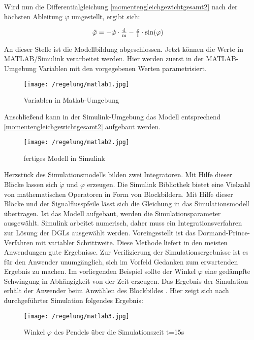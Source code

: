 Wird nun die Differentialgleichung \ref{momentengleichgewichtgesamt2} nach der höchsten Ableitung $\ddot\varphi$ umgestellt, ergibt sich:

\begin{align}
	\ddot\varphi = -\dot\varphi \cdot \tfrac{\i{d}}{\i{m}} - \tfrac{\i{g}}{\i{l}} \cdot \si{sin}(\varphi)
	\label{diffgleichung} 
\end{align}

An dieser Stelle ist die Modellbildung abgeschlossen. Jetzt können die Werte in MATLAB/Simulink  verarbeitet werden.
Hier werden zuerst in der MATLAB-Umgebung Variablen mit den vorgegebenen Werten parametrisiert.

\begin{figure}[h]
	\centering
	\texttt{[image: /regelung/matlab1.jpg]}
	\label{fig:matlab1}
	\caption{Variablen in Matlab-Umgebung}
\end{figure}

Anschließend kann in der Simulink-Umgebung das Modell entsprechend \ref{momentengleichgewichtgesamt2} aufgebaut werden.

\begin{figure}[h]
	\centering
	\texttt{[image: /regelung/matlab2.jpg]}
	\label{fig:matlab2}
	\caption{fertiges Modell in Simulink}
\end{figure}

Herzstück des Simulationsmodells bilden zwei Integratoren.
Mit Hilfe dieser Blöcke lassen sich  $\dot{\varphi}$ und $\varphi$ erzeugen.
Die Simulink Bibliothek bietet eine Vielzahl von mathematischen Operatoren in Form von Blockbildern.
Mit Hilfe dieser Blöcke und der Signalflusspfeile lässt sich die Gleichung in das Simulationsmodell übertragen.
Ist das Modell aufgebaut, werden die Simulationsparameter ausgewählt. 
Simulink arbeitet numerisch, daher muss ein Integrationsverfahren zur Lösung der DGLs ausgewählt werden. Voreingestellt ist das Dormand-Prince-Verfahren mit variabler Schrittweite.
Diese Methode liefert in den meisten Anwendungen gute Ergebnisse. \autocite[S.~6]{scherf2010}
Zur Verifizierung der Simulationsergebnisse ist es für den Anwender unumgänglich, sich im Vorfeld Gedanken zum erwartenden Ergebnis zu machen.
Im vorliegenden Beispiel sollte der Winkel $\varphi$ eine gedämpfte Schwingung in Abhängigkeit von der Zeit erzeugen.
Das Ergebnis der Simulation erhält der Anwender beim Anwählen des Blockbildes \grqq.
Hier zeigt sich nach durchgeführter Simulation folgendes Ergebnis:

\begin{figure}[h]
	\centering
	\texttt{[image: /regelung/matlab3.jpg]}
	\label{fig:matlab3}
	\caption{ Winkel $\varphi$ des Pendels über die Simulationszeit t=15s}
\end{figure}



